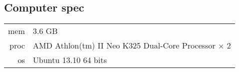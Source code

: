 \subsection{Computer spec}

\begin{tabular}{rl}
mem & 3.6 GB\\
proc & AMD Athlon(tm) II Neo K325 Dual-Core Processor × 2\\
os & Ubuntu 13.10 64 bits\\
\end{tabular}
